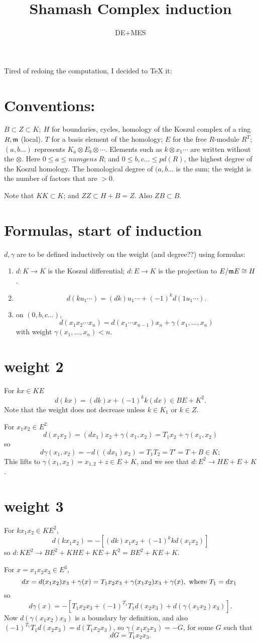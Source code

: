 \documentclass[11pt]{amsart}
\title{Shamash Complex induction}
\author{DE+MES}
\def\g{{\gamma}}
\def\mm{{\frak m}}
\begin{document}
\maketitle
Tired of redoing the computation, I decided to TeX it:

\section{Conventions:} $B\subset Z \subset K;\ H$ for boundaries, cycles, homology of the Koszul complex of a  ring $R,\mm$ (local). $T$ for a basis element of the homology; $E$ for the free $R$-module $R^T$; 
$(a,b...)$ represents $K_a\otimes E_b\otimes \cdots$. Elements such as $k\otimes x_1\cdots$ are written without the $\otimes$.
Here $0\leq a\leq numgens\ R$; and $0\leq b,c\dots\leq pd(R)$, the highest degree of the Koszul homology. The homological degree of $(a,b\dots$ is the sum; the weight is the
number of factors that are $>0$.

Note that $KK \subset K$; and $ZZ\subset H+B = Z$. Also $ZB\subset B$.

\section{Formulas, start of induction}
$d,\g$ are to be defined inductively on the weight (and degree??) using formulas:

\begin{enumerate}
\item $d:K\to K$ is the Koszul differential; $d: E \to K$ is the projection to $E/\mm E \cong H$.
\item 
$$
d(ku_1\cdots) = (dk)u_1\cdots +(-1)^kd(1u_1\cdots).
$$
\item
on $(0,b,c\dots)$, 
$$
d(x_1x_2\cdots x_n) = d(x_1\cdots x_{n-1})x_n+\g(x_1,\dots, x_n)
$$
with weight $\g(x_1,\dots, x_n)<n$.
\end{enumerate}

\section{weight 2} 
For $kx\in KE$ 
$$
d(kx) = (dk)x+(-1)^k k(dx) \in BE+K^2.
$$
Note that the weight does not decrease unless $k\in K_1$ or $k \in Z$.

For $x_1x_2\in E^2$
$$
d(x_1x_2)= (dx_1)x_2 +\g(x_1,x_2) = T_1x_2+\gamma(x_1,x_2)
$$
so 
$$
d\gamma(x_1,x_2) = -d((dx_1)x_2) = T_1T_2 = T' = T+B  \in K;
$$
This lifts to $\g(x_1,x_2)=x_{1,2}+z \in E+K$, 
and we see that $d:E^2\to HE+ E+K$.

\section{weight 3}
For $kx_1x_2\in KE^2$,
$$
d(kx_1x_2) = -[(dk)x_1x_2 + (-1)^k kd(x_1x_2)]
$$
so $d: KE^2 \to BE^2+KHE+KE+K^2 = BE^2+KE+K.$

For $x = x_1x_2x_3\in E^3$,
$$
dx = d(x_1x_2)x_3+\g(x) = T_1x_2x_3+\g(x_1x_2)x_3+\g(x), \hbox{ where $T_1 = dx_1$ }
$$
so
$$
d\g(x) = -[T_1x_2x_3 + (-1)^{T_1}T_1d(x_2x_3) + d(\g(x_1x_2)x_3)].
$$
Now $d(\g(x_1x_2)x_3)$ is a boundary by definition, and also $(-1)^{T_1}T_1d(x_2x_3) = d(T_1x_2x_3)$, so
 $\g(x_1x_2x_3) = -G$, for some $G$ such that
$$
dG = T_1x_2x_3.
$$
\end{document}
